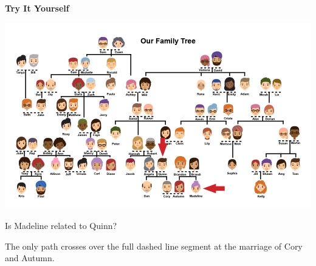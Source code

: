 \documentclass{ximera}
\begin{document}
\quad \\
\quad \\




\begin{example}
\quad \\
\textbf{Try It Yourself}

\begin{image}
\includegraphics{pics/Madeline_Quinn_arrow.png}
\end{image}

Is Madeline related to Quinn?
\begin{multipleChoice}
\end{multipleChoice}
\begin{feedback}
The only path crosses over the full dashed line segment at the marriage of Cory and Autumn.
\end{feedback}


\end{example}
\end{document}
